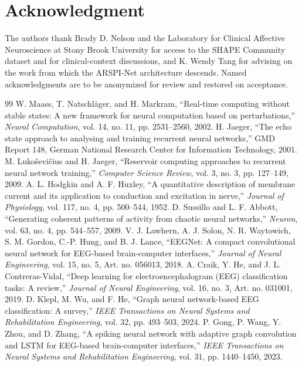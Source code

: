 \documentclass[journal]{IEEEtran}
\begin{document}
\section*{Acknowledgment}
The authors thank Brady D. Nelson and the Laboratory for Clinical Affective Neuroscience at Stony Brook University for access to the SHAPE Community dataset and for clinical-context discussions, and K. Wendy Tang for advising on the work from which the ARSPI-Net architecture descends. Named acknowledgments are to be anonymized for review and restored on acceptance.

\balance
\begin{thebibliography}{99}
 W. Maass, T. Natschl\"ager, and H. Markram, ``Real-time computing without stable states: A new framework for neural computation based on perturbations,'' \emph{Neural Computation}, vol. 14, no. 11, pp. 2531--2560, 2002.
 H. Jaeger, ``The echo state approach to analysing and training recurrent neural networks,'' GMD Report 148, German National Research Center for Information Technology, 2001.
 M. Luko\v{s}evi\v{c}ius and H. Jaeger, ``Reservoir computing approaches to recurrent neural network training,'' \emph{Computer Science Review}, vol. 3, no. 3, pp. 127--149, 2009.
 A. L. Hodgkin and A. F. Huxley, ``A quantitative description of membrane current and its application to conduction and excitation in nerve,'' \emph{Journal of Physiology}, vol. 117, no. 4, pp. 500--544, 1952.
 D. Sussillo and L. F. Abbott, ``Generating coherent patterns of activity from chaotic neural networks,'' \emph{Neuron}, vol. 63, no. 4, pp. 544--557, 2009.
 V. J. Lawhern, A. J. Solon, N. R. Waytowich, S. M. Gordon, C.-P. Hung, and B. J. Lance, ``EEGNet: A compact convolutional neural network for EEG-based brain-computer interfaces,'' \emph{Journal of Neural Engineering}, vol. 15, no. 5, Art. no. 056013, 2018.
 A. Craik, Y. He, and J. L. Contreras-Vidal, ``Deep learning for electroencephalogram (EEG) classification tasks: A review,'' \emph{Journal of Neural Engineering}, vol. 16, no. 3, Art. no. 031001, 2019.
 D. Klepl, M. Wu, and F. He, ``Graph neural network-based EEG classification: A survey,'' \emph{IEEE Transactions on Neural Systems and Rehabilitation Engineering}, vol. 32, pp. 493--503, 2024.
 P. Gong, P. Wang, Y. Zhou, and D. Zhang, ``A spiking neural network with adaptive graph convolution and LSTM for EEG-based brain-computer interfaces,'' \emph{IEEE Transactions on Neural Systems and Rehabilitation Engineering}, vol. 31, pp. 1440--1450, 2023.

\end{thebibliography}
\end{document}
